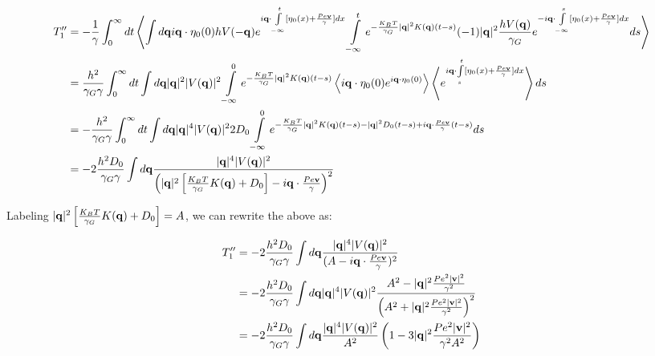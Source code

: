 \documentclass[amsmath,preprintnumbers,10pt,article,notitlepage]{revtex4-1}
\begin{document}
\begin{align}
T_1'' & =  - \dfrac{1}{\gamma} \int_0^{\infty} dt \left \langle \int d{\bf q}  i{\bf q} \cdot \eta_0(0)  hV({- \bf q})  e^{i{\bf q} \cdot \int\limits_{-\infty}^{t} [ \eta_0(x) + \frac{Pe{\bf v}}{\gamma}] dx} \int\limits_{-\infty}^{t} e^{-\frac{K_BT}{\gamma_G}|{\bf q}|^2 K({\bf q})(t-s)} (-1) |{\bf q}|^2 \dfrac{h  V({\bf q})}{\gamma_G} e^{-i{\bf q} \cdot \int\limits_{-\infty}^{s} [ \eta_0(x) + \frac{Pe{\bf v}}{\gamma} ] dx}  ds \right \rangle \\
& =   \frac{h^2}{\gamma_G \gamma}  \int_0^{\infty}  dt  \int d{\bf q}  |{\bf q}|^2 |V({\bf q})|^2   \int\limits_{-\infty}^{0} e^{-\frac{K_BT}{\gamma_G}|{\bf q}|^2 K({\bf q})(t-s)} \left \langle i{\bf q} \cdot \eta_0(0) e^{i{\bf q} \cdot  \eta_0(0)} \right \rangle \left \langle e^{i{\bf q} \cdot \int\limits_{s}^{t} [ \eta_0(x) + \frac{Pe{\bf v}}{\gamma} ] dx} \right \rangle ds  \\
& =  -\frac{h^2}{\gamma_G \gamma}   \int_0^{\infty}  dt \int d{\bf q}  |{\bf q}|^4 |V({\bf q})|^2 2D_0  \int\limits_{-\infty}^{0} e^{-\frac{K_BT}{\gamma_G}|{\bf q}|^2 K({\bf q})(t-s) - |{\bf q}|^2 D_0(t-s) + i{\bf q} \cdot \frac{Pe{\bf v}}{\gamma}(t-s)} ds  \\
& = - 2\frac{h^2 D_0}{\gamma_G \gamma} \int d{\bf q} \dfrac{ |{\bf q}|^4 |V({\bf q})|^2}{ \left(|{\bf q}|^2 \left[ \frac{K_BT}{\gamma_G} K({\bf q}) + D_0 \right] - i{\bf q} \cdot \frac{Pe{\bf v}}{\gamma} \right)^2} \\
\label{eq:NoiseForceDiffusion1}
\end{align}

Labeling $|{\bf q}|^2 \left[ \frac{K_BT}{\gamma_G} K({\bf q}) + D_0 \right] = A$, we can rewrite the above as:

\begin{align}
T_1'' & = - 2\frac{h^2 D_0}{\gamma_G \gamma} \int d{\bf q} \dfrac{ |{\bf q}|^4 |V({\bf q})|^2}{ (A - i{\bf q} \cdot \frac{Pe{\bf v}}{\gamma} )^2} \\
& = - 2 \frac{h^2 D_0}{\gamma_G \gamma} \int d{\bf q}  |{\bf q}|^4 |V({\bf q})|^2 \dfrac{A^2 - |{\bf q}|^2 \frac{Pe^2 |{\bf v}|^2}{\gamma^2}}{\left( A^2 + |{\bf q}|^2 \frac{Pe^2 |{\bf v}|^2}{\gamma^2} \right)^2} \\
& = -2 \frac{h^2 D_0}{\gamma_G \gamma} \int d{\bf q}  \dfrac{ |{\bf q}|^4 |V({\bf q})|^2}{A^2} \left( 1 - 3 |{\bf q}|^2 \frac{Pe^2 |{\bf v}|^2}{\gamma^2 A^2}  \right) \\
\label{eq:NoiseForceDiffusion1cont}
\end{align}
\end{document}
